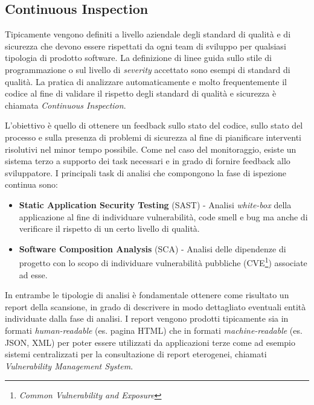 \subsection{Continuous Inspection}
Tipicamente vengono definiti a livello aziendale degli standard di qualità e di sicurezza che devono essere rispettati da ogni team di sviluppo per qualsiasi tipologia di prodotto software. La definizione di linee guida sullo stile di programmazione o sul livello di \textit{severity} accettato sono esempi di standard di qualità. La pratica di analizzare automaticamente e molto frequentemente il codice al fine di validare il rispetto degli standard di qualità e sicurezza è chiamata \textit{Continuous
Inspection}.

L’obiettivo è quello di ottenere un feedback sullo stato del codice, sullo stato
del processo e sulla presenza di problemi di sicurezza al fine di pianificare interventi
risolutivi nel minor tempo possibile. Come nel caso del monitoraggio, esiste un sistema terzo a supporto dei task necessari e in grado di fornire feedback allo sviluppatore. I principali task di analisi che compongono la fase di ispezione continua sono:

\begin{itemize}
    \item \textbf{Static Application Security Testing} (SAST) - Analisi \textit{white-box} della applicazione al fine di individuare vulnerabilità, code smell e bug ma anche di verificare il rispetto di un certo livello di qualità.
    \item \textbf{Software Composition Analysis} (SCA) - Analisi delle dipendenze di progetto con lo scopo di individuare vulnerabilità pubbliche (CVE\footnote{\textit{Common Vulnerability and Exposure}}) associate ad esse.
\end{itemize}

In entrambe le tipologie di analisi è fondamentale ottenere come risultato un report della scansione, in grado di descrivere in modo dettagliato eventuali entità individuate dalla fase di analisi. I report vengono prodotti tipicamente sia in formati \textit{human-readable} (es. pagina HTML) che in formati \textit{machine-readable} (es. JSON, XML) per poter essere utilizzati da applicazioni terze come ad esempio sistemi centralizzati per la consultazione di report eterogenei, chiamati \textit{Vulnerability Management System}.

